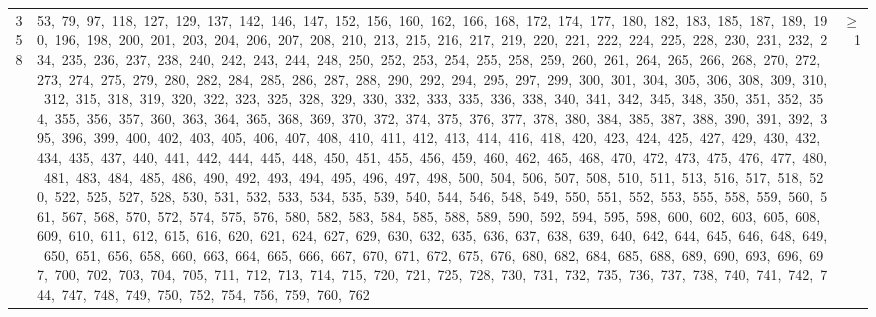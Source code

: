 \begin{longtable}{c|p{}|r}
358 & 53,\ 79,\ 97,\ 118,\ 127,\ 129,\ 137,\ 142,\ 146,\ 147,\ 152,\ 156,\ 160,\ 162,\ 166,\ 168,\ 172,\ 174,\ 177,\ 180,\ 182,\ 183,\ 185,\ 187,\ 189,\ 190,\ 196,\ 198,\ 200,\ 201,\ 203,\ 204,\ 206,\ 207,\ 208,\ 210,\ 213,\ 215,\ 216,\ 217,\ 219,\ 220,\ 221,\ 222,\ 224,\ 225,\ 228,\ 230,\ 231,\ 232,\ 234,\ 235,\ 236,\ 237,\ 238,\ 240,\ 242,\ 243,\ 244,\ 248,\ 250,\ 252,\ 253,\ 254,\ 255,\ 258,\ 259,\ 260,\ 261,\ 264,\ 265,\ 266,\ 268,\ 270,\ 272,\ 273,\ 274,\ 275,\ 279,\ 280,\ 282,\ 284,\ 285,\ 286,\ 287,\ 288,\ 290,\ 292,\ 294,\ 295,\ 297,\ 299,\ 300,\ 301,\ 304,\ 305,\ 306,\ 308,\ 309,\ 310,\ 312,\ 315,\ 318,\ 319,\ 320,\ 322,\ 323,\ 325,\ 328,\ 329,\ 330,\ 332,\ 333,\ 335,\ 336,\ 338,\ 340,\ 341,\ 342,\ 345,\ 348,\ 350,\ 351,\ 352,\ 354,\ 355,\ 356,\ 357,\ 360,\ 363,\ 364,\ 365,\ 368,\ 369,\ 370,\ 372,\ 374,\ 375,\ 376,\ 377,\ 378,\ 380,\ 384,\ 385,\ 387,\ 388,\ 390,\ 391,\ 392,\ 395,\ 396,\ 399,\ 400,\ 402,\ 403,\ 405,\ 406,\ 407,\ 408,\ 410,\ 411,\ 412,\ 413,\ 414,\ 416,\ 418,\ 420,\ 423,\ 424,\ 425,\ 427,\ 429,\ 430,\ 432,\ 434,\ 435,\ 437,\ 440,\ 441,\ 442,\ 444,\ 445,\ 448,\ 450,\ 451,\ 455,\ 456,\ 459,\ 460,\ 462,\ 465,\ 468,\ 470,\ 472,\ 473,\ 475,\ 476,\ 477,\ 480,\ 481,\ 483,\ 484,\ 485,\ 486,\ 490,\ 492,\ 493,\ 494,\ 495,\ 496,\ 497,\ 498,\ 500,\ 504,\ 506,\ 507,\ 508,\ 510,\ 511,\ 513,\ 516,\ 517,\ 518,\ 520,\ 522,\ 525,\ 527,\ 528,\ 530,\ 531,\ 532,\ 533,\ 534,\ 535,\ 539,\ 540,\ 544,\ 546,\ 548,\ 549,\ 550,\ 551,\ 552,\ 553,\ 555,\ 558,\ 559,\ 560,\ 561,\ 567,\ 568,\ 570,\ 572,\ 574,\ 575,\ 576,\ 580,\ 582,\ 583,\ 584,\ 585,\ 588,\ 589,\ 590,\ 592,\ 594,\ 595,\ 598,\ 600,\ 602,\ 603,\ 605,\ 608,\ 609,\ 610,\ 611,\ 612,\ 615,\ 616,\ 620,\ 621,\ 624,\ 627,\ 629,\ 630,\ 632,\ 635,\ 636,\ 637,\ 638,\ 639,\ 640,\ 642,\ 644,\ 645,\ 646,\ 648,\ 649,\ 650,\ 651,\ 656,\ 658,\ 660,\ 663,\ 664,\ 665,\ 666,\ 667,\ 670,\ 671,\ 672,\ 675,\ 676,\ 680,\ 682,\ 684,\ 685,\ 688,\ 689,\ 690,\ 693,\ 696,\ 697,\ 700,\ 702,\ 703,\ 704,\ 705,\ 711,\ 712,\ 713,\ 714,\ 715,\ 720,\ 721,\ 725,\ 728,\ 730,\ 731,\ 732,\ 735,\ 736,\ 737,\ 738,\ 740,\ 741,\ 742,\ 744,\ 747,\ 748,\ 749,\ 750,\ 752,\ 754,\ 756,\ 759,\ 760,\ 762 & $\ge$ 1 \\

\end{longtable}
